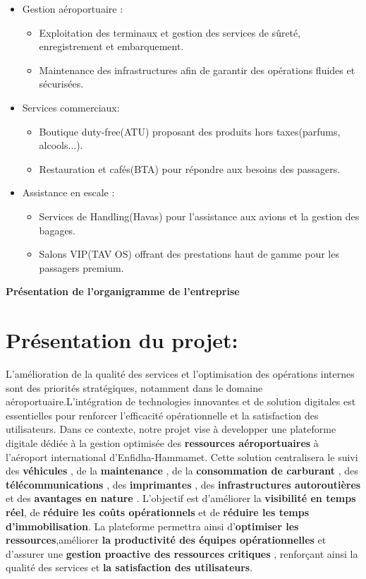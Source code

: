 \documentclass[a4paper,11pt]{report}
\begin{document}
\begin{itemize}
\item Gestion aéroportuaire :
	\begin{itemize}
	\item Exploitation des terminaux et gestion des services de sûreté, enregistrement et embarquement.
	\item Maintenance des infrastructures afin de garantir des opérations fluides et sécurisées.
	\end{itemize}
	
\item Services commerciaux:
	\begin{itemize}
		\item Boutique duty-free(ATU) proposant des produits hors taxes(parfums, alcools...).
		\item Restauration et cafés(BTA) pour répondre aux besoins des passagers.
	\end{itemize}

	\item Assistance en escale :
	\begin{itemize}
	\item Services de Handling(Havas) pour l'assistance aux avions et la gestion des bagages.
	\item Salons VIP(TAV OS) offrant des prestations haut de gamme pour les passagers premium.
	\end{itemize}
\end{itemize}

\textbf{Présentation de l'organigramme de l'entreprise}



\newpage
\section{Présentation du projet: }

L'amélioration de la qualité des services et l'optimisation des opérations internes sont des priorités stratégiques, notamment dans le domaine aéroportuaire.L'intégration de technologies innovantes et de solution digitales est essentielles pour renforcer l'efficacité opérationnelle et la satisfaction des utilisateurs.
\newline
Dans ce contexte, notre projet vise à developper une plateforme digitale dédiée à la gestion optimisée des \textbf{ ressources aéroportuaires}  à l'aéroport international d'Enfidha-Hammamet. Cette solution centralisera le suivi des \textbf{véhicules} , de la \textbf{maintenance} , de la \textbf{consommation de carburant} , des \textbf{télécommunications} , des \textbf{imprimantes} , des \textbf{infrastructures autoroutières}  et des \textbf{avantages en nature} . L'objectif est d'améliorer la \textbf{visibilité en temps réel}, de \textbf{réduire les coûts opérationnels}  et de  \textbf{réduire les temps d'immobilisation}. La plateforme permettra ainsi d'\textbf{optimiser les ressources},améliorer \textbf{la productivité des équipes opérationnelles}  et d'assurer une \textbf{gestion proactive des ressources critiques}  , renforçant ainsi la qualité des services et \textbf{ la satisfaction des utilisateurs}.
\end{document}

